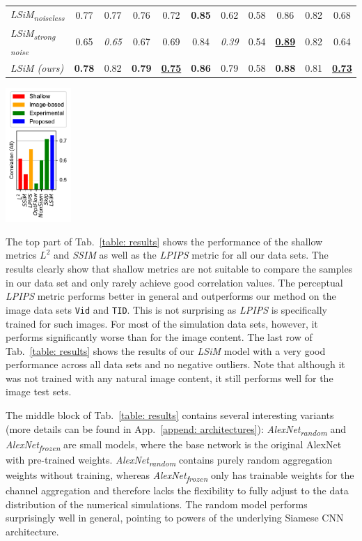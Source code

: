 \documentclass{article}
\newcommand{\best}[1]{\textbf{\textcolor{green!25!black}{\underline{#1}}}}
\newcommand{\bestErr}[1]{\textbf{\textcolor{green!25!black}{#1}}}
\newcommand{\bad}[1]{\textit{\textcolor{red!40!black}{#1}}}
\begin{document}
\begin{table}[tp]
\begin{tabular}[b]{l c c c c | c | c c c c c}
        \it LSiM\textsubscript{noiseless}     & 0.77 & 0.77 & 0.76 & 0.72  & \bestErr{0.85} & 0.62 & 0.58 & 0.86 & 0.82 & 0.68 \\
        \it LSiM\textsubscript{strong noise}  & 0.65 & \bad{0.65} & 0.67 & 0.69  & 0.84 & \bad{0.39} & 0.54 & \best{0.89} & 0.82 & 0.64 \\
        \it LSiM (ours)                       & \bestErr{0.78} & 0.82 & \bestErr{0.79} & \best{0.75}  & \bestErr{0.86} & 0.79 & 0.58 & \bestErr{0.88} & 0.81 & \best{0.73} \\
   
        \bottomrule
    \end{tabular}
    \hspace{-0.0cm}
    \includegraphics[width=0.187\textwidth]{Images/PerformanceAll}
\end{table}

The top part of Tab.~\ref{table: results} shows the performance of the shallow metrics \textit{$L^2$} and \textit{SSIM} as well as the \textit{LPIPS} metric \citep{zhang2018} for all our data sets. The results clearly show that shallow metrics are not suitable to compare the samples in our data set and only rarely achieve good correlation values. The perceptual \textit{LPIPS} metric performs better in general and outperforms our method on the image data sets \texttt{Vid} and \texttt{TID}. This is not surprising as \textit{LPIPS} is specifically trained for such images. For most of the simulation data sets, however, it performs significantly worse than for the image content. The last row of Tab.~\ref{table: results} shows the results of our \textit{LSiM} model with a very good performance across all data sets and no negative outliers. Note that although it was not trained with any natural image content, it still performs well for the image test sets.

The middle block of Tab.~\ref{table: results} contains several interesting variants (more details can be found in App.~\ref{append: architectures}):
\textit{AlexNet\textsubscript{random}} and \textit{AlexNet\textsubscript{frozen}} are small models, where the base network is the original AlexNet with pre-trained weights. \textit{AlexNet\textsubscript{random}} contains purely random aggregation weights without training, whereas \textit{AlexNet\textsubscript{frozen}} only has trainable weights for the channel aggregation and therefore lacks the flexibility to fully adjust to the data distribution of the numerical simulations. The random model performs surprisingly well in general, pointing to powers of the underlying Siamese CNN architecture.
\end{document}
